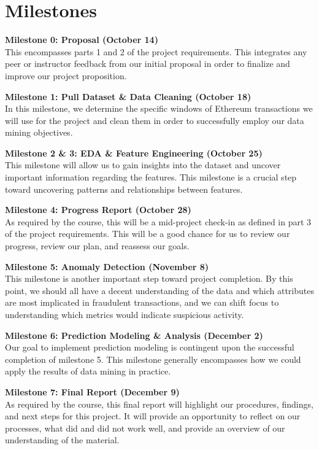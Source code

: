 \documentclass[sigconf]{acmart}
\begin{document}
\section{Milestones}
\textbf{Milestone 0: Proposal (October 14)}\\
This encompasses parts 1 and 2 of the project requirements. This integrates any peer or instructor feedback from our initial proposal in order to finalize and improve our project proposition.

\textbf{Milestone 1: Pull Dataset \& Data Cleaning (October 18)}\\
In this milestone, we determine the specific windows of Ethereum transactions we will use for the project and clean them in order to successfully employ our data mining objectives.

\textbf{Milestone 2 \& 3: EDA \& Feature Engineering (October 25)}\\
This milestone will allow us to gain insights into the dataset and uncover important information regarding the features. This milestone is a crucial step toward uncovering patterns and relationships between features.

\textbf{Milestone 4: Progress Report (October 28)}\\
As required by the course, this will be a mid-project check-in as defined in part 3 of the project requirements. This will be a good chance for us to review our progress, review our plan, and reassess our goals.

\textbf{Milestone 5: Anomaly Detection (November 8)}\\
This milestone is another important step toward project completion. By this point, we should all have a decent understanding of the data and which attributes are most implicated in fraudulent transactions, and we can shift focus to understanding which metrics would indicate suspicious activity.

\textbf{Milestone 6: Prediction Modeling \& Analysis (December 2)}\\
Our goal to implement prediction modeling is contingent upon the successful completion of milestone 5. This milestone generally encompasses how we could apply the results of data mining in practice.

\textbf{Milestone 7: Final Report (December 9)}\\
As required by the course, this final report will highlight our procedures, findings, and next steps for this project. It will provide an opportunity to reflect on our processes, what did and did not work well, and provide an overview of our understanding of the material.
\end{document}
